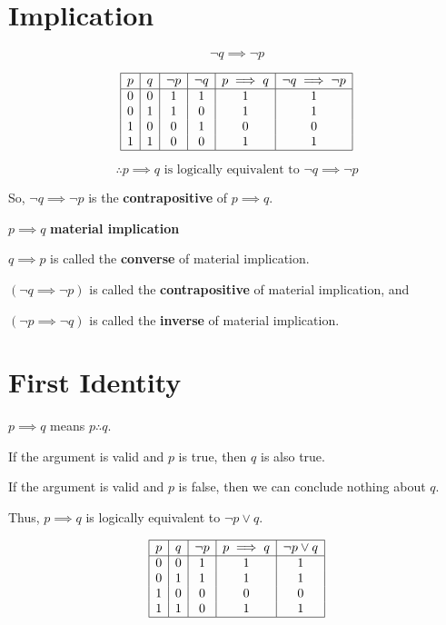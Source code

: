 \documentclass{article}
\begin{document}
\section{Implication}

\begin{equation}
  \neg q \implies \neg p
\end{equation}

\begin{equation}
\begin{array}{|c|c|c|c|c|c|}
\hline
p & q & \neg p & \neg q & p \implies q & \neg q \implies \neg p \\
\hline
0 & 0 & 1 & 1 & 1 & 1 \\
0 & 1 & 1 & 0 & 1 & 1 \\
1 & 0 & 0 & 1 & 0 & 0 \\
1 & 1 & 0 & 0 & 1 & 1 \\
\hline
\end{array}
\end{equation}

\[
  \therefore p \implies q \text{ is logically equivalent to } \neg q \implies \neg p
\]

So, $\neg q \implies \neg p$ is the \textbf{contrapositive} of $p \implies q$. 

$p \implies q$ \textbf{material implication}

$q \implies p$ is called the \textbf{converse} of material implication.

$(\neg q \implies \neg p)$ is called the \textbf{contrapositive} of material implication, and

$(\neg p \implies \neg q)$ is called the \textbf{inverse} of material implication.

\section{First Identity}

$p \implies q$ means $p \therefore q$. 

If the argument is valid and $p$ is true, then $q$ is also true.

If the argument is valid and $p$ is false, then we can conclude nothing about $q$.

Thus, $p \implies q$ is logically equivalent to $\neg p \lor q$.


\begin{equation}
\begin{array}{|c|c|c|c|c|}
\hline
p & q & \neg p & p \implies q & \neg p \lor q \\
\hline
0 & 0 & 1 & 1 & 1 \\
0 & 1 & 1 & 1 & 1 \\
1 & 0 & 0 & 0 & 0 \\
1 & 1 & 0 & 1 & 1 \\
\hline
\end{array}
\end{equation}
\end{document}
